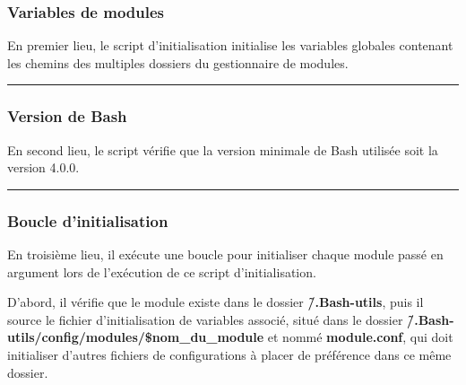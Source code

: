 \documentclass[a4paper,10pt]{article}
\begin{document}
\color{sec3}
\subsubsection{Variables de modules}\color{text}

\begin{justify}
    En premier lieu, le script d'initialisation initialise les variables globales contenant les chemins des multiples dossiers du gestionnaire de modules.
\end{justify}


\color{sec3}\par\noindent\rule{\textwidth}{0.4pt}\color{text}

\color{sec3}
\subsubsection{Version de Bash}\color{text}

\begin{justify}
    En second lieu, le script vérifie que la version minimale de Bash utilisée soit la version 4.0.0.
\end{justify}



\color{sec3}\par\noindent\rule{\textwidth}{0.4pt}\color{text}

\color{sec3}
\subsubsection{Boucle d'initialisation}\color{text}

\begin{justify}
    En troisième lieu, il exécute une boucle pour initialiser chaque module passé en argument lors de l'exécution de ce script d'initialisation.
\end{justify}

\begin{justify}
    D'abord, il vérifie que le module existe dans le dossier \textbf{\color{path}\~/.Bash-utils}, puis il source le fichier d'initialisation de variables associé, situé dans le dossier \textbf{\color{path}\~/.Bash-utils/config/modules/\color{vars}\$nom\_du\_module} et nommé \textbf{\color{path}module.conf}, qui doit initialiser d'autres fichiers de configurations à placer de préférence dans ce même dossier.
\end{justify}
\end{document}
